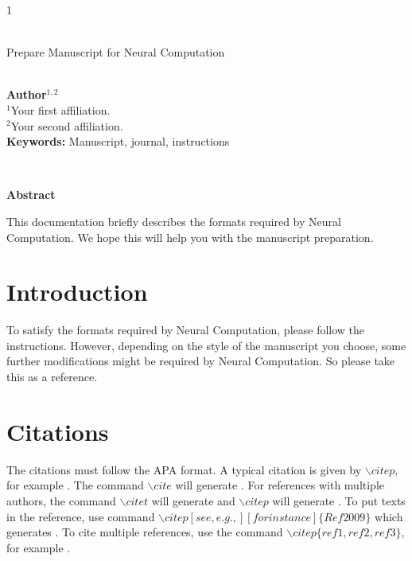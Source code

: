 \documentclass[12pt]{article}
\begin{document}
\hspace{13.9cm}1

\ \vspace{20mm}\\

{\LARGE Prepare Manuscript for Neural Computation}

\ \\
{\bf \large Author$^{\displaystyle 1, \displaystyle 2}$}\\
{$^{\displaystyle 1}$Your first affiliation.}\\
{$^{\displaystyle 2}$Your second affiliation.}\\
%

{\bf Keywords:} Manuscript, journal, instructions

\thispagestyle{empty}
%
\ \vspace{-0mm}\\
%
\begin{center} {\bf Abstract} \end{center}
This documentation briefly describes the formats required by Neural Computation. We hope this will help you with the manuscript preparation.

\section{Introduction}
To satisfy the formats required by Neural Computation, please follow the instructions. However, depending on the style of the manuscript you choose, some further modifications might be required by Neural Computation. So please take this as a reference.

\section{Citations}
The citations must follow the APA format. A typical citation is given by $\backslash citep$, for example \citep{Ref2009}. The command $\backslash cite$ will generate \cite{Ref2009}. For references with multiple authors, the command $\backslash citet$ will generate \citet{Ref2008} and $\backslash citep$ will generate \citep{Ref2008}. To put texts in the reference, use command $\backslash citep[see, e.g.,][for instance]\{Ref2009\}$ which generates \citep[see,
e.g.,][for instance]{Ref2009}. To cite multiple references, use the command $\backslash citep\{ref1,ref2,ref3\}$, for example \citep[compare][]{Ref2008,Ref2009}.
\end{document}
